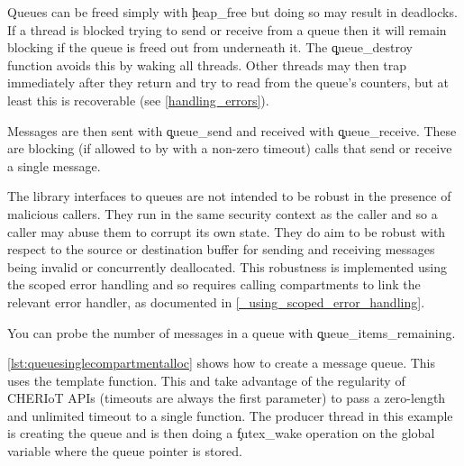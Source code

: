 
Queues can be freed simply with \c{heap_free} but doing so may result in deadlocks.
If a thread is blocked trying to send or receive from a queue then it will remain blocking if the queue is freed out from underneath it.
The \c{queue_destroy} function avoids this by waking all threads.
Other threads may then trap immediately after they return and try to read from the queue's counters, but at least this is recoverable (see \ref{handling_errors}).


Messages are then sent with \c{queue_send} and received with \c{queue_receive}.
These are blocking (if allowed to by with a non-zero timeout) calls that send or receive a single message.



\begin{caution}
The library interfaces to queues are not intended to be robust in the presence of malicious callers.
They run in the same security context as the caller and so a caller may abuse them to corrupt its own state.
They do aim to be robust with respect to the source or destination buffer for sending and receiving messages being invalid or concurrently deallocated.
This robustness is implemented using the scoped error handling and so requires calling compartments to link the relevant error handler, as documented in \ref{_using_scoped_error_handling}.
\end{caution}

You can probe the number of messages in a queue with \c{queue_items_remaining}.


\ref{lst:queuesinglecompartmentalloc} shows how to create a message queue.
This uses the  template function.
This and  take advantage of the regularity of CHERIoT APIs (timeouts are always the first parameter) to pass a zero-length and unlimited timeout to a single function.
The producer thread in this example is creating the queue and is then doing a \c{futex_wake} operation on the global variable where the queue pointer is stored.

\codelisting[filename=examples/producer_consumer/queue.cc,marker=allocate,label=lst:queuesinglecompartmentalloc,caption="Allocating a message queue for use in a single compartment"]{}

